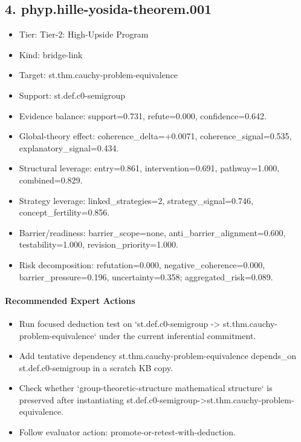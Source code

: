 \documentclass[11pt]{article}
\begin{document}
\subsection*{4. phyp.hille-yosida-theorem.001}
\begin{itemize}
\item Tier: Tier-2: High-Upside Program
\item Kind: bridge-link
\item Target: st.thm.cauchy-problem-equivalence
\item Support: st.def.c0-semigroup
\item Evidence balance: support=0.731, refute=0.000, confidence=0.642.
\item Global-theory effect: coherence\_delta=+0.0071, coherence\_signal=0.535, explanatory\_signal=0.434.
\item Structural leverage: entry=0.861, intervention=0.691, pathway=1.000, combined=0.829.
\item Strategy leverage: linked\_strategies=2, strategy\_signal=0.746, concept\_fertility=0.856.
\item Barrier/readiness: barrier\_scope=none, anti\_barrier\_alignment=0.600, testability=1.000, revision\_priority=1.000.
\item Risk decomposition: refutation=0.000, negative\_coherence=0.000, barrier\_pressure=0.196, uncertainty=0.358; aggregated\_risk=0.089.
\end{itemize}
\paragraph{Recommended Expert Actions}
\begin{itemize}
\item Run focused deduction test on `st.def.c0-semigroup -> st.thm.cauchy-problem-equivalence` under the current inferential commitment.
\item Add tentative dependency st.thm.cauchy-problem-equivalence depends\_on st.def.c0-semigroup in a scratch KB copy.
\item Check whether `group-theoretic-structure mathematical structure` is preserved after instantiating st.def.c0-semigroup->st.thm.cauchy-problem-equivalence.
\item Follow evaluator action: promote-or-retest-with-deduction.
\end{itemize}
\end{document}
